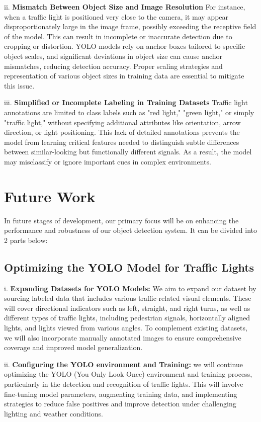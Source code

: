 \documentclass[journal,transmag]{IEEEtran}
\begin{document}
ii. \textbf{Mismatch Between Object Size and Image Resolution} For instance, when a traffic light is positioned very close to the camera, it may appear disproportionately large in the image frame, possibly exceeding the receptive field of the model. This can result in incomplete or inaccurate detection due to cropping or distortion. YOLO models rely on anchor boxes tailored to specific object scales, and significant deviations in object size can cause anchor mismatches, reducing detection accuracy. Proper scaling strategies and representation of various object sizes in training data are essential to mitigate this issue.

iii. \textbf{Simplified or Incomplete Labeling in Training Datasets} Traffic light annotations are limited to class labels such as "red light," "green light," or simply "traffic light," without specifying additional attributes like orientation, arrow direction, or light positioning. This lack of detailed annotations prevents the model from learning critical features needed to distinguish subtle differences between similar-looking but functionally different signals. As a result, the model may misclassify or ignore important cues in complex environments. 


\section{Future Work}

In future stages of development, our primary focus will be on enhancing the performance and robustness of our object detection system. It can be divided into 2 parts below:

\subsection{Optimizing the YOLO Model for Traffic Lights}

i. \textbf{Expanding Datasets for YOLO Models:} We aim to expand our dataset by sourcing labeled data that includes various traffic-related visual elements. These will cover directional indicators such as left, straight, and right turns, as well as different types of traffic lights, including pedestrian signals, horizontally aligned lights, and lights viewed from various angles. To complement existing datasets, we will also incorporate manually annotated images to ensure comprehensive coverage and improved model generalization.

ii. \textbf{Configuring the YOLO environment and Training:} we will continue optimizing the YOLO (You Only Look Once) environment and training process, particularly in the detection and recognition of traffic lights. This will involve fine-tuning model parameters, augmenting training data, and implementing strategies to reduce false positives and improve detection under challenging lighting and weather conditions.
\end{document}
